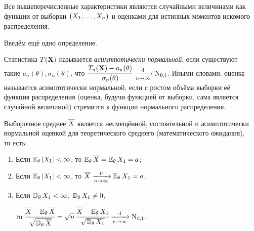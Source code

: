 Все вышеперечисленные характеристики являются случайными величинами как функции от выборки $\bigl(X_1, \ldots, X_n \bigr)$ и оценками для истинных моментов искомого распределения.

Введём ещё одно определение.
\begin{defn}
    Статистика $T(\mathbf{X})$ называется \textit{асимптотически нормальной}, если существуют такие 
    $a_n(\theta), \sigma_n(\theta)$, что $\cfrac{T_n(\mathbf{X}) - a_n(\theta)}{\sigma_n(\theta)} \xrightarrow[n \to \infty]{\text{d}} \operatorname{\mathrm{N}}_{0, 1}$.
    Иными словами, оценка называется асимптотически нормальной, если с ростом объёма выборки её функция распределения (оценка, будучи функцией от выборки, сама является случайной величиной) стремится к функции нормального распределения. %
\end{defn}

\begin{thm*}
    Выборочное среднее $\overline{X}$ является несмещённой, состоятельной и асимптотически нормальной оценкой для теоретического среднего (математического ожидания), то есть:

    \begin{enumerate}[label={\arabic*.}]
        \item Если $\operatorname{\operatorname{\mathbb{E}}_{\theta}} |X_{1}|<\infty$, то $\operatorname{\operatorname{\mathbb{E}}_{\theta}} \overline{X} = \operatorname{\operatorname{\mathbb{E}}_{\theta}} X_{1}=a$;
        \item Если $\operatorname{\operatorname{\mathbb{E}}_{\theta}} |X_{1}|<\infty$, то $\overline{X} \xrightarrow[n \to \infty]{\text{p}} \operatorname{\operatorname{\mathbb{E}}_{\theta}} X_{1}=a$;
        \item Если $\operatorname{\mathbb{D}_{\theta}}  X_{1}<\infty,~ \operatorname{\mathbb{D}_{\theta}} X_{1} \neq 0$, 
        
        то $\cfrac{\overline{X} - \operatorname{\operatorname{\mathbb{E}}_{\theta}} \overline{X} }{\sqrt{\operatorname{\mathbb{D}_{\theta}} \overline{X}}} = \sqrt{n} \,\cfrac{\overline{X} - \operatorname{\operatorname{\mathbb{E}}_{\theta}} X_1}{\sqrt{\operatorname{\mathbb{D}_{\theta}} X_1}} \xrightarrow[n \to \infty]{\text{d}} \operatorname{\mathrm{N}}_{0, 1}$.
    \end{enumerate}
\end{thm*}

